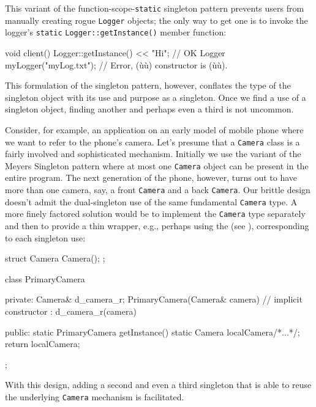 \noindent This variant of the function-scope-\lstinline!static! singleton pattern
prevents users from manually creating rogue \lstinline!Logger! objects; the
only way to get one is to invoke the logger's \lstinline!static!
\lstinline!Logger::getInstance()! member function:

\begin{emcppslisting}[emcppsbatch=e10]
void client()
{
    Logger::getInstance() << "Hi";  // OK
    Logger myLogger("myLog.txt");   // Error, (ù{}ù) constructor is (ù{}ù).
}
\end{emcppslisting}

\noindent This formulation of the singleton pattern, however, conflates the type
of the singleton object with its use and purpose as a singleton. Once we
find a use of a singleton object, finding another and perhaps even a
third is not uncommon.  

Consider, for example, an application on an early
model of mobile phone where we want to refer to the phone's camera.
Let's presume that a \lstinline!Camera! class is a fairly involved and
sophisticated mechanism. Initially we use the variant of the Meyers
Singleton pattern where at most one \lstinline!Camera! object can be
present in the entire program. The next generation of the phone, however, turns out to have more than
one camera, say, a front \lstinline!Camera! and a back \lstinline!Camera!. Our
brittle design doesn't
admit the dual-singleton use of the same fundamental \lstinline!Camera!
type. A more finely factored solution would be to implement the
\lstinline!Camera! type separately and then to provide a thin wrapper,
e.g., perhaps using the  (see ), corresponding to each singleton
use:

\begin{emcppshiddenlisting}[emcppsbatch=e11]
struct Camera {
  Camera();
};    
\end{emcppshiddenlisting}
\begin{emcppslisting}[emcppsbatch=e11]
class PrimaryCamera
{
private:
    Camera& d_camera_r;
    PrimaryCamera(Camera& camera)  // implicit constructor
      : d_camera_r(camera) { }  

public:
    static PrimaryCamera getInstance()
    {
        static Camera localCamera{/*...*/};
        return localCamera;
    }
};
\end{emcppslisting}

\noindent With this design, adding a second and even a third singleton that is
able to reuse the underlying \lstinline!Camera! mechanism is facilitated.

